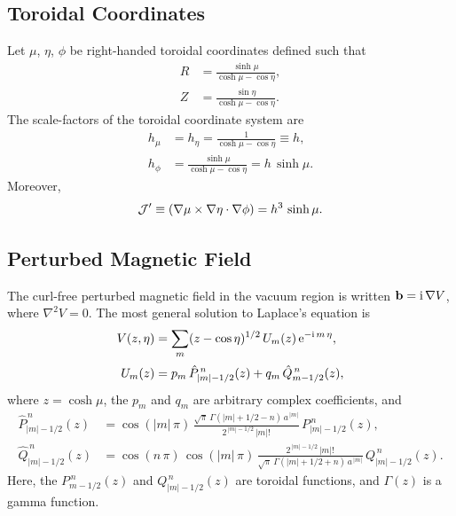 \documentclass[12pt,prb,aps]{revtex4-1}
\begin{document}
\subsection{Toroidal Coordinates}
Let $\mu$, $\eta$, $\phi$ be right-handed toroidal coordinates defined such that
\begin{align}
R &= \frac{\sinh\mu}{\cosh\mu-\cos\eta},\\[0.5ex]
Z&=\frac{\sin\eta}{\cosh\mu-\cos\eta}.
\end{align}
The scale-factors of the toroidal coordinate system are
\begin{align}
h_\mu&=h_\eta= \frac{1}{\cosh\mu-\cos\eta}\equiv h,\\[0.5ex]
h_\phi &= \frac{\sinh\mu}{\cosh\mu-\cos\eta} = h\,\sinh\mu.
\end{align}
Moreover, 
\begin{equation}
{\cal J}' \equiv (\nabla\mu\times\nabla\eta\cdot\nabla\phi)= h^3\,\sinh\mu.
\end{equation}

\subsection{Perturbed Magnetic Field}
The curl-free perturbed magnetic field in the vacuum region is written ${\bf b} = {\rm i}\,\nabla V$,
where
$\nabla^2 V =0$.
The most general solution to Laplace's equation is
\begin{align}
V(z,\eta)&= \sum_m (z-\cos\eta)^{1/2}\,U_m(z)\,{\rm e}^{-{\rm i}\,m\,\eta}, \\[0.5ex]
U_m(z) &= p_m\,\hat{P}_{|m|-1/2}^{\,n}(z)+q_m\,\hat{Q}_{m-1/2}^{\,n}(z),
\end{align}
where  $z=\cosh\mu$, the $p_m$ and $q_m$ are arbitrary complex coefficients, and 
\begin{align}\label{e21}
\hat{P}_{|m|-1/2}^{\,n}(z) &= \cos(|m|\,\pi)\,\frac{\sqrt{\pi}\,\Gamma(|m|+1/2-n)\,a^{\,|m|}}{2^{\,|m|-1/2}\,|m|!}\,P_{|m|-1/2}^{\,n}(z),\\[0.5ex]
\hat{Q}_{|m|-1/2}^{\,n}(z)&= \cos(n\,\pi)\,\cos(|m|\,\pi)\,\frac{2^{\,|m|-1/2}\,|m|!}{\sqrt{\pi}\,\Gamma(|m|+1/2+n)\,a^{\,|m|}}\,Q_{|m|-1/2}^{\,n}(z).\label{e22}
\end{align}
Here,  the $P_{m-1/2}^{\,n}(z)$  and $Q_{|m|-1/2}^{\,n}(z)$ are toroidal functions,\cite{abrama}  and $\Gamma(z)$ is a
gamma function.\cite{abramb}
\end{document}
